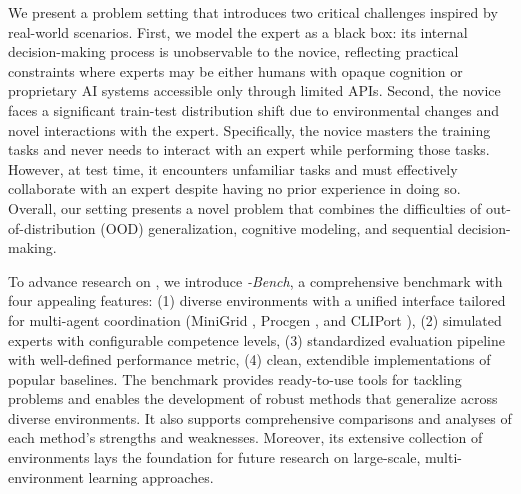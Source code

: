 
We present a problem setting that introduces two critical challenges inspired by real-world scenarios. First, we model the expert as a black box: its internal decision-making process is unobservable to the novice, reflecting practical constraints where experts may be either humans with opaque cognition or proprietary AI systems accessible only through limited APIs.
Second, the novice faces a significant train-test distribution shift due to environmental changes and novel interactions with the expert. 
Specifically, the novice masters the training tasks and never needs to interact with an expert while performing those tasks. However, at test time, it encounters unfamiliar tasks and must effectively collaborate with an expert despite having no prior experience in doing so.
Overall, our setting presents a novel problem that combines the difficulties of out-of-distribution (OOD) generalization, cognitive modeling, and sequential decision-making.




To advance research on \ourMethod, we introduce \textit{\ourMethod-Bench}, a comprehensive benchmark with four appealing features: (1) diverse environments with a unified interface tailored for multi-agent coordination (MiniGrid \citep{MinigridMiniworld23}, Procgen \citep{pmlr-v119-cobbe20a}, and CLIPort \citep{shridhar2021cliport}), (2) simulated experts with configurable competence levels, (3) standardized evaluation pipeline with well-defined performance metric, (4) clean, extendible implementations of popular baselines. 
The benchmark provides ready-to-use tools for tackling \ourMethod problems and enables the development of robust methods that generalize across diverse environments. It also supports comprehensive comparisons and analyses of each method's strengths and weaknesses. 
Moreover, its extensive collection of environments lays the foundation for future research on large-scale, multi-environment learning approaches.

